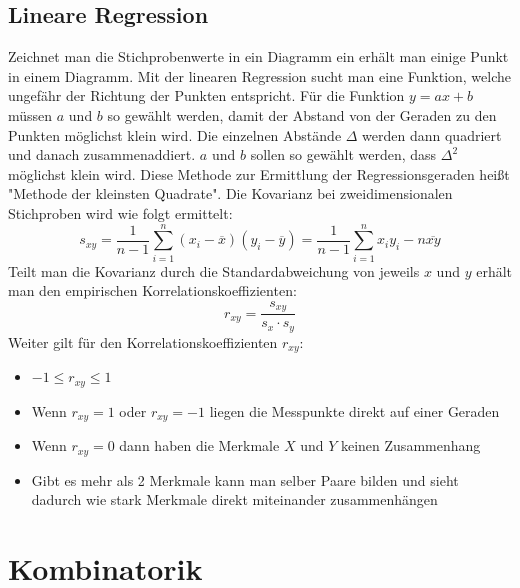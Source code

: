 \documentclass[a4paper]{scrartcl}
\begin{document}
            \subsection{Lineare Regression}
                Zeichnet man die Stichprobenwerte in ein Diagramm ein erhält man einige Punkt in einem Diagramm. Mit der linearen Regression sucht man eine Funktion, welche ungefähr
                der Richtung der Punkten entspricht. Für die Funktion \(y = ax + b\) müssen \(a\) und \(b\) so gewählt werden, damit der Abstand von der Geraden zu den Punkten möglichst klein wird.
                Die einzelnen Abstände \(\Delta \) werden dann quadriert und danach zusammenaddiert. \(a\) und \(b\) sollen so gewählt werden, dass \(\Delta ^2\) möglichst klein wird.
                Diese Methode zur Ermittlung der Regressionsgeraden heißt "Methode der kleinsten Quadrate". Die Kovarianz bei zweidimensionalen Stichproben wird wie folgt ermittelt:
                \begin{equation*}
                   s_{xy}= \frac{1}{n - 1} \sum_{i=1}^n (x_i - \overline{x})(y_i - \overline{y}) = \frac{1}{n - 1}\sum_{i=1}^n x_i y_i - n \overline{xy}
                \end{equation*}
                Teilt man die Kovarianz durch die Standardabweichung von jeweils \(x\) und \(y\) erhält man den empirischen Korrelationskoeffizienten:
                \begin{equation*}
                    r_{xy} = \frac{s_{xy}}{s_x \cdot s_y}
                \end{equation*}
                Weiter gilt für den Korrelationskoeffizienten \(r_{xy}\): 
                \begin{itemize}
                    \item \(-1 \leq r_{xy} \leq 1\)
                    \item Wenn \(r_{xy} = 1\) oder \(r_{xy} = -1\) liegen die Messpunkte direkt auf einer Geraden
                    \item Wenn \(r_{xy} = 0\) dann haben die Merkmale \(X\) und \(Y\) keinen Zusammenhang
                    \item Gibt es mehr als 2 Merkmale kann man selber Paare bilden und sieht dadurch wie stark Merkmale direkt miteinander zusammenhängen 
                \end{itemize} 

    \section{Kombinatorik}
\end{document}
